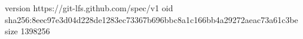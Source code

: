 version https://git-lfs.github.com/spec/v1
oid sha256:8eec97e3d04d228de1283ec73367b696bbc8a1c166bb4a29272aeac73a61c3be
size 1398256
